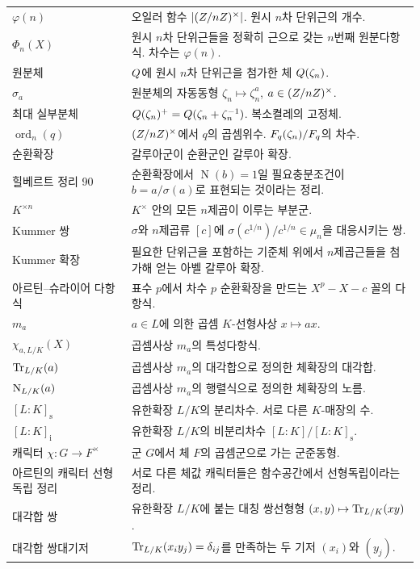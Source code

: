 \begin{longtable}{>{\raggedright\arraybackslash}p{}>{\raggedright\arraybackslash}p{}}
$\varphi(n)$ & 오일러 함수 $|(Z/nZ)^\times|$. 원시 $n$차 단위근의 개수. \\
$\Phi_n(X)$ & 원시 $n$차 단위근들을 정확히 근으로 갖는 $n$번째 원분다항식. 차수는 $\varphi(n)$. \\
원분체 & $Q$에 원시 $n$차 단위근을 첨가한 체 $Q(\zeta_n)$. \\
$\sigma_a$ & 원분체의 자동동형 $\zeta_n\mapsto\zeta_n^a$, $a\in(Z/nZ)^\times$. \\
최대 실부분체 & $Q(\zeta_n)^+=Q(\zeta_n+\zeta_n^{-1})$. 복소켤레의 고정체. \\
$\operatorname{ord}_n(q)$ & $(Z/nZ)^\times$에서 $q$의 곱셈위수. $F_q(\zeta_n)/F_q$의 차수. \\
순환확장 & 갈루아군이 순환군인 갈루아 확장. \\
힐베르트 정리 90 & 순환확장에서 $\operatorname N(b)=1$일 필요충분조건이 $b=a/\sigma(a)$로 표현되는 것이라는 정리. \\
$K^{\times n}$ & $K^\times$ 안의 모든 $n$제곱이 이루는 부분군. \\
Kummer 쌍 & $\sigma$와 $n$제곱류 $[c]$에 $\sigma(c^{1/n})/c^{1/n}\in\mu_n$을 대응시키는 쌍. \\
Kummer 확장 & 필요한 단위근을 포함하는 기준체 위에서 $n$제곱근들을 첨가해 얻는 아벨 갈루아 확장. \\
아르틴--슈라이어 다항식 & 표수 $p$에서 차수 $p$ 순환확장을 만드는 $X^p-X-c$ 꼴의 다항식. \\
$m_a$ & $a\in L$에 의한 곱셈 $K$-선형사상 $x\mapsto ax$. \\
$\chi_{a,L/K}(X)$ & 곱셈사상 $m_a$의 특성다항식. \\
$\operatorname{Tr}_{L/K}(a)$ & 곱셈사상 $m_a$의 대각합으로 정의한 체확장의 대각합. \\
$\operatorname{N}_{L/K}(a)$ & 곱셈사상 $m_a$의 행렬식으로 정의한 체확장의 노름. \\
$[L:K]_{\mathrm s}$ & 유한확장 $L/K$의 분리차수. 서로 다른 $K$-매장의 수. \\
$[L:K]_{\mathrm i}$ & 유한확장 $L/K$의 비분리차수 $[L:K]/[L:K]_{\mathrm s}$. \\
캐릭터 $\chi:G\to F^\times$ & 군 $G$에서 체 $F$의 곱셈군으로 가는 군준동형. \\
아르틴의 캐릭터 선형독립 정리 & 서로 다른 체값 캐릭터들은 함수공간에서 선형독립이라는 정리. \\
대각합 쌍 & 유한확장 $L/K$에 붙는 대칭 쌍선형형 $(x,y)\mapsto\operatorname{Tr}_{L/K}(xy)$. \\
대각합 쌍대기저 & $\operatorname{Tr}_{L/K}(x_i y_j)=\delta_{ij}$를 만족하는 두 기저 $(x_i)$와 $(y_j)$. \\

\end{longtable}
